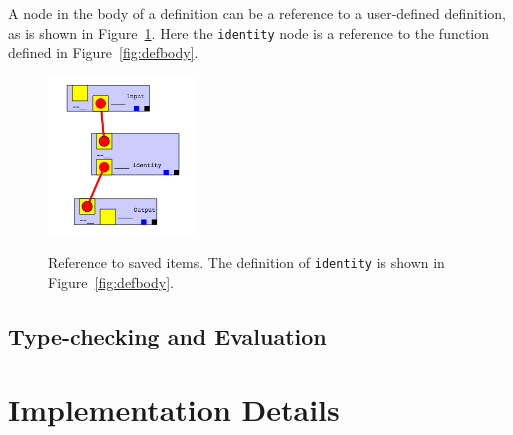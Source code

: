 \documentclass[12pt,UTF8,a4]{article}
\newcommand{\code}[1]{\texttt{#1}}
\begin{document}
A node in the body of a definition can be a reference to a user-defined definition, as is shown in Figure~\ref{fig:ref}. Here the \code{identity} node is a reference to the function defined in Figure~\ref{fig:defbody}.
\begin{figure}[h]
\center
\includegraphics[width=0.35\textwidth]{./images/ref} \\
\caption{Reference to saved items. The definition of \code{identity} is shown in Figure~\ref{fig:defbody}.}\label{fig:ref}
\end{figure}

\subsection{Type-checking and Evaluation}



\section{Implementation Details}
\end{document}
